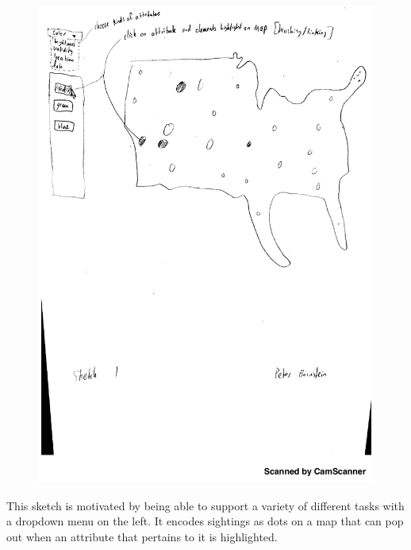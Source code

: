 \documentclass{neu_handout}
\begin{document}
\begin{figure}[h]
\centering
{
\includegraphics[width=0.7\linewidth]{peter1}
}
\end{figure}

This sketch is motivated by being able to support a variety of different tasks with a dropdown menu on the left. It encodes sightings as dots on a map that can pop out when an attribute that pertains to it is highlighted. \\\\

\newpage
\end{document}
